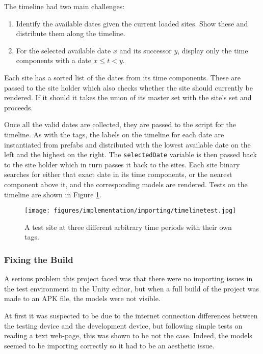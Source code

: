 \documentclass[12pt, a4paper]{article}
\begin{document}
The timeline had two main challenges:
\begin{enumerate}
    \item Identify the available dates given the current loaded sites. Show these and distribute them along the timeline.
    \item For the selected available date $x$ and its successor $y$, display only the time components with a date $x \leq t < y$.
\end{enumerate}

Each site has a sorted list of the dates from its time components. These are passed to the site holder which also checks whether the site should currently be rendered. If it should it takes the union of its master set with the site's set and proceeds. 

Once all the valid dates are collected, they are passed to the script for the timeline. As with the tags, the labels on the timeline for each date are instantiated from prefabs and distributed with the lowest available date on the left and the highest on the right. The \verb|selectedDate| variable is then passed back to the site holder which in turn passes it back to the sites. Each site binary searches for either that exact date in its time components, or the nearest component above it, and the corresponding models are rendered. Tests on the timeline are shown in Figure \ref{fig:timelinetest}.

\begin{figure}[h]
    \centering
    \texttt{[image: figures/implementation/importing/timelinetest.jpg]}
        \caption{A test site at three different arbitrary time periods with their own tags.}
        \label{fig:timelinetest}
\end{figure}

\subsubsection{Fixing the Build}
A serious problem this project faced was that there were no importing issues in the test environment in the Unity editor, but when a full build of the project was made to an APK file, the models were not visible. 

At first it was suspected to be due to the internet connection differences between the testing device and the development device, but following simple tests on reading a text web-page, this was shown to be not the case. Indeed, the models seemed to be importing correctly so it had to be an aesthetic issue. 
\end{document}
